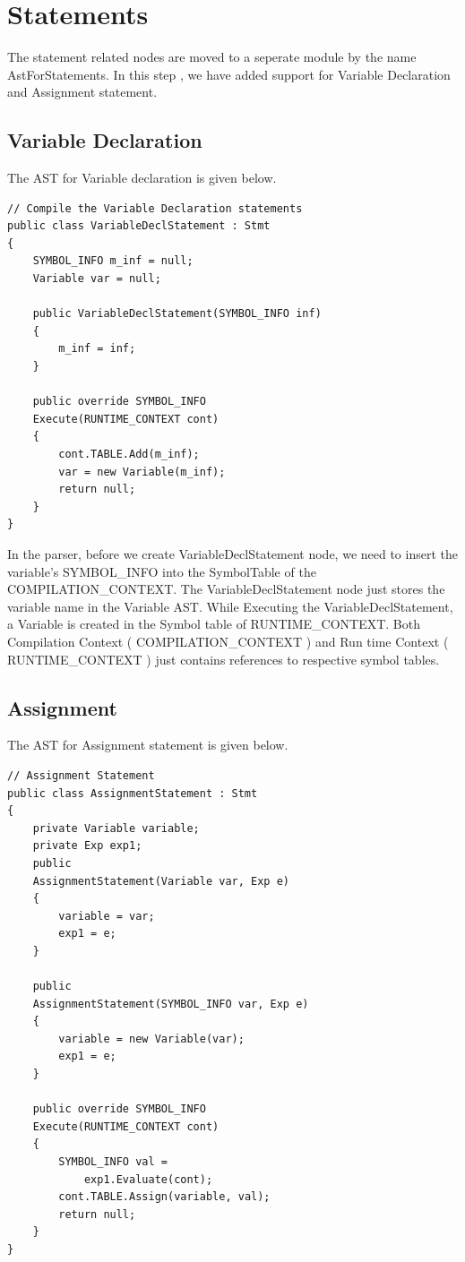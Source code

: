 \section{Statements}
The statement related nodes are moved to a seperate module by the name AstForStatements. In this step , we have added support for Variable Declaration and Assignment statement. 
\subsection{Variable Declaration}
The AST for Variable declaration is given below.
\lstset{style=csharp}
\begin{lstlisting}
// Compile the Variable Declaration statements
public class VariableDeclStatement : Stmt
{
	SYMBOL_INFO m_inf = null;
	Variable var = null;
	
	public VariableDeclStatement(SYMBOL_INFO inf)
	{
		m_inf = inf;
	}
	
	public override SYMBOL_INFO 
	Execute(RUNTIME_CONTEXT cont)
	{
		cont.TABLE.Add(m_inf);
		var = new Variable(m_inf);
		return null;
	}
}
\end{lstlisting}
In the parser, before we create VariableDeclStatement node, we need to insert the variable's SYMBOL\_INFO into the SymbolTable of the COMPILATION\_CONTEXT. The VariableDeclStatement node just stores the variable name in the Variable AST. While Executing the VariableDeclStatement, a Variable is created in the Symbol table of RUNTIME\_CONTEXT. Both Compilation Context ( COMPILATION\_CONTEXT ) and Run time Context ( RUNTIME\_CONTEXT ) just contains references to respective symbol tables. 
\clearpage
\subsection{Assignment}
The AST for Assignment statement is given below.
\lstset{style=csharp}
\begin{lstlisting}
// Assignment Statement
public class AssignmentStatement : Stmt
{
	private Variable variable;
	private Exp exp1;
	public 
	AssignmentStatement(Variable var, Exp e)
	{
		variable = var;
		exp1 = e;
	}
	
	public 
	AssignmentStatement(SYMBOL_INFO var, Exp e)
	{
		variable = new Variable(var);
		exp1 = e;
	}
	
	public override SYMBOL_INFO 
	Execute(RUNTIME_CONTEXT cont)
	{
		SYMBOL_INFO val = 
			exp1.Evaluate(cont);
		cont.TABLE.Assign(variable, val);
		return null;
	}
}
\end{lstlisting}
\clearpage
